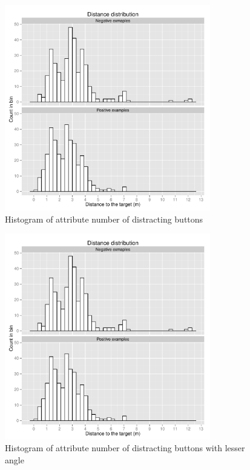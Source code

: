 \begin{figure}[!htbp]
  \centering
	\includegraphics[page=5,width=0.8\textwidth]{Images/fref_distrib}
	\caption{Histogram of attribute number of distracting buttons}
	\label{fig:fref-distrib-distbuttons}
\end{figure}

\begin{figure}[!htbp]
  \centering
	\includegraphics[page=6,width=0.8\textwidth]{Images/fref_distrib}
	\caption{Histogram of attribute number of distracting buttons with lesser angle}
	\label{fig:fref-distrib-distangles}
\end{figure}

